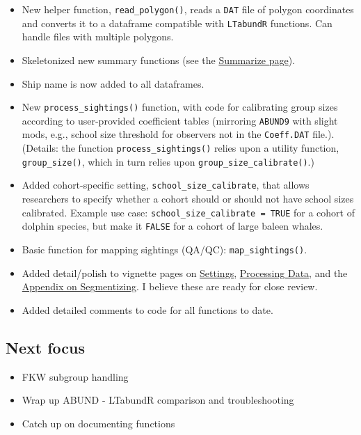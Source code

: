 \documentclass[
]{book}
\begin{document}
\begin{itemize}
\item
  New helper function, \texttt{read\_polygon()}, reads a \texttt{DAT} file of polygon coordinates and converts it to a dataframe compatible with \texttt{LTabundR} functions. Can handle files with multiple polygons.
\item
  Skeletonized new summary functions (see the \protect\hyperlink{summarize}{Summarize page}).
\item
  Ship name is now added to all dataframes.
\item
  New \texttt{process\_sightings()} function, with code for calibrating group sizes according to user-provided coefficient tables (mirroring \texttt{ABUND9} with slight mods, e.g., school size threshold for observers not in the \texttt{Coeff.DAT} file.). (Details: the function \texttt{process\_sightings()} relies upon a utility function, \texttt{group\_size()}, which in turn relies upon \texttt{group\_size\_calibrate()}.)
\item
  Added cohort-specific setting, \texttt{school\_size\_calibrate}, that allows researchers to specify whether a cohort should or should not have school sizes calibrated. Example use case: \texttt{school\_size\_calibrate\ =\ TRUE} for a cohort of dolphin species, but make it \texttt{FALSE} for a cohort of large baleen whales.
\item
  Basic function for mapping sightings (QA/QC): \texttt{map\_sightings()}.
\item
  Added detail/polish to vignette pages on \protect\hyperlink{settings}{Settings}, \protect\hyperlink{processing}{Processing Data}, and the \protect\hyperlink{segmentizing}{Appendix on Segmentizing}. I believe these are ready for close review.
\item
  Added detailed comments to code for all functions to date.
\end{itemize}

\hypertarget{next-focus}{%
\subsection*{Next focus}\label{next-focus}}

\begin{itemize}
\item
  FKW subgroup handling
\item
  Wrap up ABUND - LTabundR comparison and troubleshooting
\item
  Catch up on documenting functions
\end{itemize}
\end{document}
